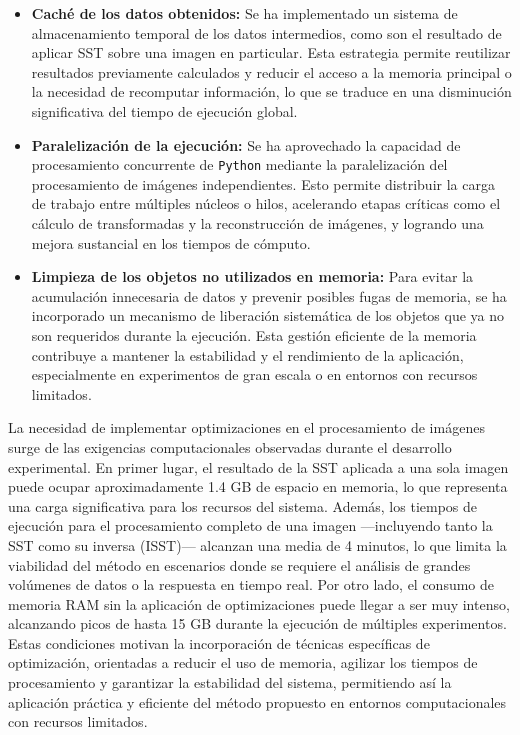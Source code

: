 \begin{itemize}
    \item \textbf{Caché de los datos obtenidos:} Se ha implementado un sistema de almacenamiento temporal de los datos intermedios, como son el resultado de aplicar SST sobre una imagen en particular. Esta estrategia permite reutilizar resultados previamente calculados y reducir el acceso a la memoria principal o la necesidad de recomputar información, lo que se traduce en una disminución significativa del tiempo de ejecución global.
    
    \item \textbf{Paralelización de la ejecución:} Se ha aprovechado la capacidad de procesamiento concurrente de \texttt{Python} mediante la paralelización del procesamiento de imágenes independientes. Esto permite distribuir la carga de trabajo entre múltiples núcleos o hilos, acelerando etapas críticas como el cálculo de transformadas y la reconstrucción de imágenes, y logrando una mejora sustancial en los tiempos de cómputo.
    
    \item \textbf{Limpieza de los objetos no utilizados en memoria:} Para evitar la acumulación innecesaria de datos y prevenir posibles fugas de memoria, se ha incorporado un mecanismo de liberación sistemática de los objetos que ya no son requeridos durante la ejecución. Esta gestión eficiente de la memoria contribuye a mantener la estabilidad y el rendimiento de la aplicación, especialmente en experimentos de gran escala o en entornos con recursos limitados.
\end{itemize}

La necesidad de implementar optimizaciones en el procesamiento de imágenes surge de las exigencias computacionales observadas durante el desarrollo experimental. En primer lugar, el resultado de la SST aplicada a una sola imagen puede ocupar aproximadamente 1.4 GB de espacio en memoria, lo que representa una carga significativa para los recursos del sistema. Además, los tiempos de ejecución para el procesamiento completo de una imagen —incluyendo tanto la SST como su inversa (ISST)— alcanzan una media de 4 minutos, lo que limita la viabilidad del método en escenarios donde se requiere el análisis de grandes volúmenes de datos o la respuesta en tiempo real. Por otro lado, el consumo de memoria RAM sin la aplicación de optimizaciones puede llegar a ser muy intenso, alcanzando picos de hasta 15 GB durante la ejecución de múltiples experimentos. Estas condiciones motivan la incorporación de técnicas específicas de optimización, orientadas a reducir el uso de memoria, agilizar los tiempos de procesamiento y garantizar la estabilidad del sistema, permitiendo así la aplicación práctica y eficiente del método propuesto en entornos computacionales con recursos limitados.

